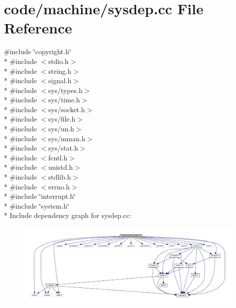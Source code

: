 \section{code/machine/sysdep.cc File Reference}
\label{sysdep_8cc}
{\ttfamily \#include \char`\"{}copyright.\+h\char`\"{}}\\*
{\ttfamily \#include $<$stdio.\+h$>$}\\*
{\ttfamily \#include $<$string.\+h$>$}\\*
{\ttfamily \#include $<$signal.\+h$>$}\\*
{\ttfamily \#include $<$sys/types.\+h$>$}\\*
{\ttfamily \#include $<$sys/time.\+h$>$}\\*
{\ttfamily \#include $<$sys/socket.\+h$>$}\\*
{\ttfamily \#include $<$sys/file.\+h$>$}\\*
{\ttfamily \#include $<$sys/un.\+h$>$}\\*
{\ttfamily \#include $<$sys/mman.\+h$>$}\\*
{\ttfamily \#include $<$sys/stat.\+h$>$}\\*
{\ttfamily \#include $<$fcntl.\+h$>$}\\*
{\ttfamily \#include $<$unistd.\+h$>$}\\*
{\ttfamily \#include $<$stdlib.\+h$>$}\\*
{\ttfamily \#include $<$errno.\+h$>$}\\*
{\ttfamily \#include \char`\"{}interrupt.\+h\char`\"{}}\\*
{\ttfamily \#include \char`\"{}system.\+h\char`\"{}}\\*
Include dependency graph for sysdep.\+cc\+:
\nopagebreak
\begin{figure}[H]
\begin{center}
\leavevmode
\includegraphics[width=350pt]{sysdep_8cc__incl}
\end{center}
\end{figure}
